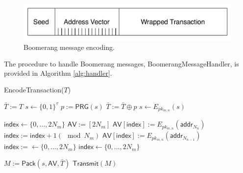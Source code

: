 \begin{figure}[ht!]
\begin{center}
\includegraphics[scale=0.4]{./images/boomerang_message.pdf}
\caption{Boomerang message encoding.}
\label{fig:boomerang_message}
\end{center}
\end{figure}

The procedure to handle Boomerang messages, {\sf BoomerangMessageHandler}, is provided in Algorithm \ref{alg:handler}. 

\begin{algorithm*}[t!]
\caption{{\sf EncodeTransaction}($T$)}
\label{alg:encode}
\begin{algorithmic}[1]

	\State $\bar{T} := T$
	\State $s \gets \{0,1\}^{\tau}$
		\State $p := \mathsf{PRG}(s)$
		\State $\bar{T} := \bar{T} \oplus p$
		\State $s \gets E_{pk_{m,n}}(s)$
	\EndFor

	\State $\mathsf{index} \gets \{0,\dots,2N_m\}$ %
	\State $\mathsf{AV} := [2N_m]$ %
		\State $\mathsf{AV}[\mathsf{index}] := E_{pk_{m,n}}(\mathsf{addr}_{N_n})$
		\State $\mathsf{index} := \mathsf{index} + 1 (\mod N_m)$
		\State $\mathsf{AV}[\mathsf{index}] := E_{pk_{m,n}}(\mathsf{addr}_{N_{n-1}})$
		\State $\mathsf{index} := \gets \{0,\dots,2N_m\}$
			\State $\mathsf{index} \gets \{0,\dots,2N_m\}$
		\EndWhile
	\EndFor

	\State $M := \mathsf{Pack}(s, \mathsf{AV}, \bar{T})$
	\State $\mathsf{Transmit}(M)$
\EndFor

\end{algorithmic}
\end{algorithm*}

